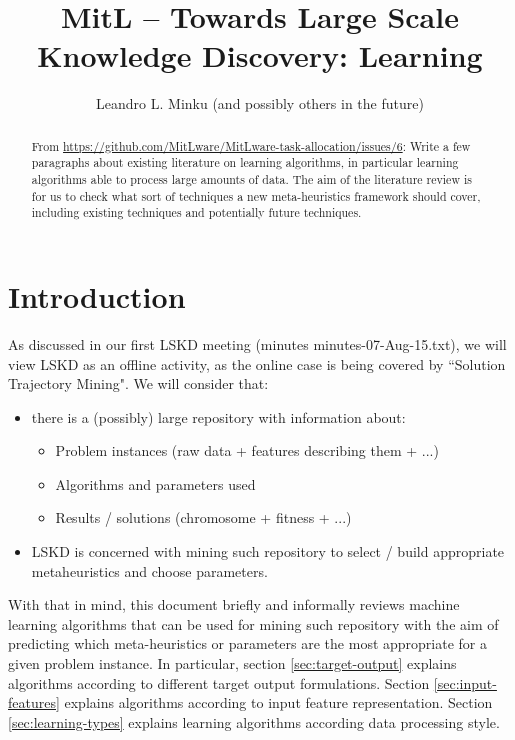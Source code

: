 \documentclass{article}
\title{MitL -- Towards Large Scale Knowledge Discovery: Learning}
\author{Leandro L. Minku (and possibly others in the future)}
\date{}
\begin{document}
\maketitle

\begin{abstract}
From \url{https://github.com/MitLware/MitLware-task-allocation/issues/6}:
Write a few paragraphs about existing literature on learning algorithms, in particular learning algorithms able to process large amounts of data. The aim of the literature review is for us to check what sort of techniques a new meta-heuristics framework should cover, including existing techniques and potentially future techniques.
\end{abstract}

\section{Introduction}

As discussed in our first LSKD meeting (minutes minutes-07-Aug-15.txt), we will view LSKD as an offline activity, as the online case is being covered by ``Solution Trajectory Mining". We will consider that:

\begin{itemize}
\item there is a (possibly) large repository with information about:
\begin{itemize}
\item Problem instances (raw data + features describing them + ...)
\item Algorithms and parameters used
\item Results / solutions (chromosome + fitness + ...)
\end{itemize}

\item LSKD is concerned with mining such repository to select / build appropriate metaheuristics and choose parameters.
\end{itemize}

With that in mind, this document briefly and informally reviews machine learning algorithms that can be used for mining such repository with the aim of predicting which meta-heuristics or parameters are the most appropriate for a given problem instance. In particular, section \ref{sec:target-output} explains algorithms according to different target output formulations. Section \ref{sec:input-features} explains algorithms according to input feature representation.  Section \ref{sec:learning-types} explains learning algorithms according data processing style. 
\end{document}
